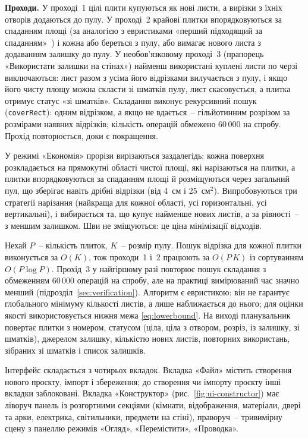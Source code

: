 \textbf{Проходи.} У проході~1 цілі плити купуються як нові листи, а вирізки з їхніх отворів додаються до пулу. У проході~2 крайові плитки впорядковуються за спаданням площі (за аналогією з евристиками «перший підходящий за спаданням»~) і кожна або береться з пулу, або вимагає нового листа з додаванням залишку до пулу. У необов'язковому проході~3 (прапорець «Використати залишки на стінах») найменш використані куплені листи по черзі виключаються: лист разом з усіма його відрізками вилучається з пулу, і якщо його чисту площу можна скласти зі шматків пулу, лист скасовується, а плитка отримує статус «зі шматків». Складання виконує рекурсивний пошук (\texttt{coverRect}): одним відрізком, а якщо не вдається~-- гільйотинним розрізом за розмірами наявних відрізків; кількість операцій обмежено 60\,000 на спробу. Прохід повторюється, доки є покращення.


У режимі «Економія» прорізи вирізаються заздалегідь: кожна поверхня розкладається на прямокутні області чистої площі, які нарізаються на плитки, а плитки впорядковуються за спаданням площі й розміщуються через загальний пул, що зберігає навіть дрібні відрізки (від 4~см і 25~см$^2$). Випробовуються три стратегії нарізання (найкраща для кожної області, усі горизонтальні, усі вертикальні), і вибирається та, що купує найменше нових листів, а за рівності~-- з меншим залишком. Шви не зміщуються: це ціна мінімізації відходів.


Нехай $P$~-- кількість плиток, $K$~-- розмір пулу. Пошук відрізка для кожної плитки виконується за $O(K)$, тож проходи~1 і~2 працюють за $O(P\,K)$ із сортуванням $O(P\log P)$. Прохід~3 у найгіршому разі повторює пошук складання з обмеженням 60\,000 операцій на спробу, але на практиці вимірюваний час значно менший (підрозділ~\ref{sec:verification}). Алгоритм є евристикою: він не гарантує глобального мінімуму кількості листів, а лише наближається до нього; для оцінки якості використовується нижня межа \eqref{eq:lowerbound}. На виході планувальник повертає плитки з номером, статусом (ціла, ціла з отвором, розріз, із залишку, зі шматків), джерелом залишку, кількістю нових листів, повторних використань, зібраних зі шматків і список залишків.


Інтерфейс складається з чотирьох вкладок. Вкладка «Файл» містить створення нового проєкту, імпорт і збереження; до створення чи імпорту проєкту інші вкладки заблоковані. Вкладка «Конструктор» (рис.~\ref{fig:ui-constructor}) має ліворуч панель із розгортними секціями (кімнати, відображення, матеріали, двері та арки, електрика, світильники, предмети на стіні), праворуч~-- тривимірну сцену з панеллю режимів «Огляд», «Перемістити», «Проводка».

